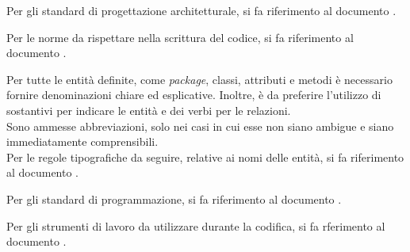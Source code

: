 	Per gli standard di progettazione architetturale, si fa riferimento al documento .

	Per le norme da rispettare nella scrittura del codice, si fa riferimento al documento .

	Per tutte le entità definite, come \textit{package}, classi, attributi e metodi è necessario fornire denominazioni chiare ed esplicative. Inoltre, è da preferire l'utilizzo di sostantivi per indicare le entità e dei verbi per le relazioni.\\
	Sono ammesse abbreviazioni, solo nei casi in cui esse non siano ambigue e siano immediatamente comprensibili. \\
	Per le regole tipografiche da seguire, relative ai nomi delle entità, si fa riferimento al documento .

	Per gli standard di programmazione, si fa riferimento al documento .

	Per gli strumenti di lavoro da utilizzare durante la codifica, si fa rferimento al documento .
